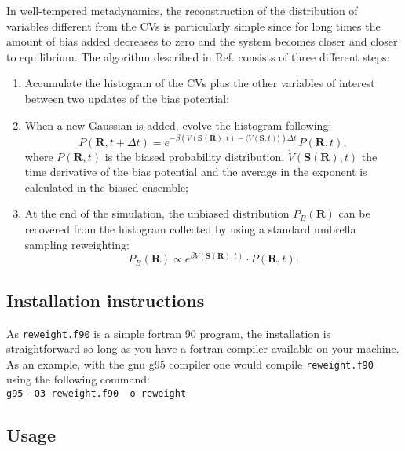 \documentclass[12pt,fleqn]{report}
\begin{document}
In well-tempered metadynamics, the reconstruction of the distribution of variables different from the CVs
is particularly simple since for long times the amount of bias added decreases to zero and the
system becomes closer and closer to equilibrium.
The algorithm described in Ref. \cite{Bonomi:2009p17105} consists of three different steps:
\begin{enumerate}
\item Accumulate the histogram of the CVs plus the other variables of interest between
two updates of the bias potential;
\item When a new Gaussian is added, evolve the histogram following:
\begin{equation}
P(\bm{R},t+\Delta t)= e^{-\beta(\dot{V}(\bm{S}(\bm{R}),t)-\langle \dot{V}(\bm{S},t) \rangle )\Delta t} \, P(\bm{R},t),
\label{evol2}
\end{equation}
where $P(\bm{R},t)$ is the  biased probability distribution, $\dot{V}(\bm{S}(\bm{R}),t)$  
the time derivative of the bias potential and the average in the exponent is calculated in the biased ensemble;
\item At the end of the simulation, the unbiased distribution $P_B(\bm{R})$ can be recovered from the histogram collected 
by using a standard umbrella sampling reweighting:
\begin{equation}
P_B(\bm{R}) \propto e^{\beta V(\bm{S}(\bm{R}),t)} \cdot P(\bm{R},t). 
\end{equation}
\end{enumerate}

\subsection{Installation instructions}
As {\tt reweight.f90} is a simple fortran 90 program, the installation is straightforward
so long as you have a fortran compiler available on your machine.
As an example, with the gnu g95 compiler one would compile {\tt reweight.f90} using the following
command:
\vspace {10pt} \\
 {\tt g95 -O3 reweight.f90 -o reweight}

\subsection{Usage}
\end{document}

